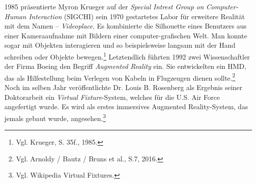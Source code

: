 1985 präsentierte Myron Krueger auf der \textit{Special Intrest Group on Computer-Human Interaction} (SIGCHI) sein 1970 gestartetes Labor für erweitere Realität mit dem Namen -- \textit{Videoplace}. Es kombinierte die Silhouette eines Benutzers aus einer Kameraaufnahme mit Bildern einer computer-grafischen Welt. Man konnte sogar mit Objekten interagieren und so beispielsweise langsam mit der Hand schreiben oder Objekte bewegen.\footnote{ Vgl. Krueger, S. 35f., 1985.} Letztendlich führten 1992 zwei Wissenschaftler der Firma Boeing den Begriff \textit{Augmented Reality} ein. Sie entwickelten ein HMD, das als Hilfestellung beim Verlegen von Kabeln in Flugzeugen dienen sollte.\footnote{ Vgl. Arnoldy / Bautz / Bruns et al., S.7, 2016.} Noch im selben Jahr veröffentlichte Dr. Louis B. Rosenberg als Ergebnis seiner Doktorarbeit ein \textit{Virtual Fixture}-System, welches für die U.S. Air Force angefertigt wurde. Es wird als erstes immersives Augmented Reality-System, das jemals gebaut wurde, angesehen.\footnote{ Vgl. Wikipedia Virtual Fixtures.}

